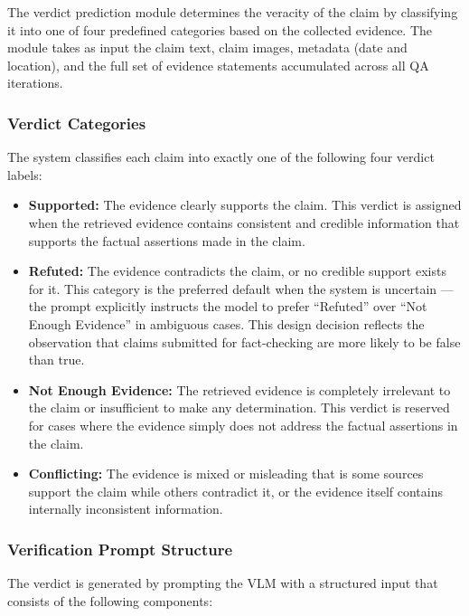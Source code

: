 The verdict prediction module determines the veracity of the claim by classifying it into one of four predefined categories based on the collected evidence. The module takes as input the claim text, claim images, metadata (date and location), and the full set of evidence statements accumulated across all QA iterations.

\subsubsection{Verdict Categories}

The system classifies each claim into exactly one of the following four verdict labels:

\begin{itemize}
    \item \textbf{Supported:} The evidence clearly supports the claim. This verdict is assigned when the retrieved evidence contains consistent and credible information that supports the factual assertions made in the claim.
    \item \textbf{Refuted:} The evidence contradicts the claim, or no credible support exists for it. This category is the preferred default when the system is uncertain — the prompt explicitly instructs the model to prefer ``Refuted'' over ``Not Enough Evidence'' in ambiguous cases. This design decision reflects the observation that claims submitted for fact-checking are more likely to be false than true.
    \item \textbf{Not Enough Evidence:} The retrieved evidence is completely irrelevant to the claim or insufficient to make any determination. This verdict is reserved for cases where the evidence simply does not address the factual assertions in the claim.
    \item \textbf{Conflicting:} The evidence is mixed or misleading that is some sources support the claim while others contradict it, or the evidence itself contains internally inconsistent information.
\end{itemize}

\subsubsection{Verification Prompt Structure}

The verdict is generated by prompting the VLM with a structured input that consists of the following components:

